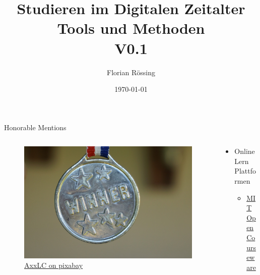 \documentclass[aspectratio=169,shownotes]{beamer}
\title{Studieren im Digitalen Zeitalter \\\small Tools und Methoden\\ V0.1}
\author{Florian Rössing}
\date{\today}
\begin{document}
\maketitle











\begin{frame}{Honorable Mentions}
    \begin{columns}[t]
        \begin{column}{0.4\textwidth}
            \vspace{-2em} 
            \begin{figure}
                \begin{flushleft}
                    \includegraphics[height=0.8\textheight,trim={4cm 0 17cm 0},clip]{graphics/winner-1548239_1280.jpg}
                    \caption*{\href{https://pixabay.com/photos/winner-medal-gold-award-success-1548239/}{AxxLC on pixabay}}    
                \end{flushleft}                
            \end{figure}            
        \end{column}
        \begin{column}{0.6\textwidth}
            \begin{itemize}
                \item Online Lern Plattformen
                \begin{itemize}
                    \item \href{https://ocw.mit.edu/}{MIT Open Courseware}

\end{itemize}
\end{itemize}
\end{column}
\end{columns}
\end{frame}
\end{document}
